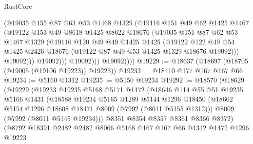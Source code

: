 \begin{lexlean}{RustCore}
\begin{coremodule}
                      (@19035
                        @155
                        @87
                        @63
                        @53
                        @1468
                        @1329
                        (@19116
                          @151
                          @49
                          @62
                          @1425
                          @1467
                          (@19122
                            @153
                            @49
                            @8618
                            @1425
                            @8622
                            @18676
                            (@19035
                              @151
                              @87
                              @62
                              @53
                              @1467
                              @1329
                              (@19116
                                @120
                                @49
                                @49
                                @1425
                                @1425
                                (@19122
                                  @122
                                  @49
                                  @54
                                  @1425
                                  @2426
                                  @18676
                                  (@19122 @87 @49 @53 @1425 @1329 @18676 @19092)))
                              @19092)))
                        @19092)))
                  @19092)))
            @19092))))
@19229 := @18637 (@18697 (@18705 (@19005 (@19106 @19223)) @19223))
@19233 := @18410 @177 @167 @167 @66
@19234 := @5160 @1312
@19235 := @5150 @19234
@19292 := @18570
    (@18629
      (@19229
        (@19233
          @19235
          @5168
          @5171
          @1472
          (@18646
            @114
            @55
            @51
            @19235
            @5166
            @1431
            (@18588
              @19234
              @5165
              @1289
              @5144
              @1296
              @18450
              (@18602 @5154 @1296 @18608 @18471 @8009 (@7992 (@8011 @5155 @1312)))
              @8009
              (@7992 (@8011 @5145 @19234)))
            @8351
            @8354
            @8357
            @8361
            @8366
            @8372)
          (@8792
            @18391
            @2482
            @2482
            @8066
            @5168
            @167
            @167
            @66
            @1312
            @1472
            @1296
            @19223

\end{coremodule}
\end{lexlean}
